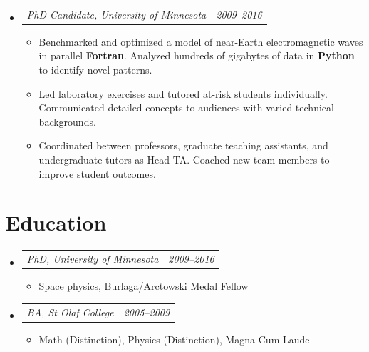 \documentclass[12pt,letterpaper]{article}
\makeatletter
\newcommand{\headerpair}[2]{
    \begin{tabular*}{\linewidth}{l@{ \extracolsep{\fill} }r} {\large\emph{#1}} & {\large\emph{#2}}
    \end{tabular*}
}
\newcommand{\headerrow}[3]{\headerpair{#1, #2}{#3}}
\newcommand{\YearRange}[2]{#1--#2}
\newcommand{\ResumeSection}[1]{\section*{{\color{MidnightBlue}#1 \sout{\hfill}}}}
\makeatother
\begin{document}
\begin{itemize}[leftmargin=\parindent]
\begin{itemize}[leftmargin=\parindent]
        \end{itemize}
    \item[]
        \headerrow
            {PhD Candidate}
            {University of Minnesota}
            {\YearRange{2009}{2016}}
        \begin{itemize}[leftmargin=\parindent]
            \item Benchmarked and optimized a model of near-Earth electromagnetic waves in parallel \textbf{Fortran}. Analyzed hundreds of gigabytes of data in \textbf{Python} to identify novel patterns.
            \item Led laboratory exercises and tutored at-risk students individually. Communicated detailed concepts to audiences with varied technical backgrounds.
            \item Coordinated between professors, graduate teaching assistants, and undergraduate tutors as Head TA. Coached new team members to improve student outcomes.
        \end{itemize}
\end{itemize}


\ResumeSection{Education}

\begin{itemize}[leftmargin=\parindent]
    \parskip=0.1em
    \itemsep=1.2em

    \item[]
        \headerrow
            {PhD}
            {University of Minnesota}
            {\YearRange{2009}{2016}}
        \begin{itemize}[leftmargin=\parindent]
            \item Space physics, Burlaga/Arctowski Medal Fellow
        \end{itemize}
    \item[]
        \headerrow
            {BA}
            {St Olaf College}
            {\YearRange{2005}{2009}}
        \begin{itemize}[leftmargin=\parindent]
            \item Math (Distinction), Physics (Distinction),
                 Magna Cum Laude
        \end{itemize}
\end{itemize}

\end{document}
